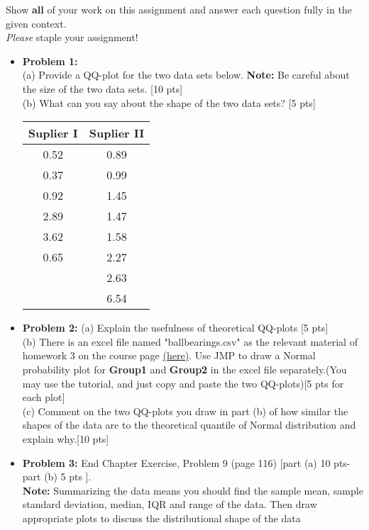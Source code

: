 \documentclass[11pt]{article}\usepackage[]{graphicx}\usepackage[]{color}
\begin{document}
\pagestyle{fancy} 

Show \textbf{all} of your work on this assignment and answer each question fully in the given context. \\


\emph{Please} staple your assignment!

\begin{itemize}

\item \textbf{Problem 1:} \\ %
(a) Provide a QQ-plot for the two data sets below. \textbf{Note:} Be careful about the size of the two data sets. [10 pts] \\
(b) What can you say about the shape of the two data sets? [5 pts]
\begin{center}
	\begin{tabular}{|cc|}	
		\hline
		Suplier I & Suplier II\\
		\hline
		0.52 & 0.89 \\
		0.37 & 0.99 \\ 
		0.92 & 1.45     \\
		2.89 & 1.47     \\
	    3.62 & 1.58     \\
	    0.65 & 2.27     \\
		     & 2.63     \\
		     & 6.54     \\   
	\hline                 
	\end{tabular}
\end{center}

\item \textbf{Problem 2:} (a) Explain the usefulness of theoretical QQ-plots  [5 pts]\\
(b) There is an excel file named "ballbearings.csv" as the relevant material of homework 3 on the course page \href{https://ashirazist.github.io/stat305.github.io/homework.html}{(here)}. Use JMP to draw a Normal probability plot for \textbf{Group1} and \textbf{Group2} in the excel file separately.(You may use the tutorial, and just copy and paste the two QQ-plots)[5 pts for each plot] \\
(c) Comment on the two QQ-plots you draw in part (b) of how similar the shapes of the data are to the theoretical quantile of Normal distribution and explain why.[10 pts]


\item \textbf{Problem 3:}   End Chapter Exercise, Problem 9 (page 116)  [part (a) 10 pts- part (b) 5 pts ]. \\
\textbf{Note:} Summarizing the data means you should find the sample mean, sample standard deviation, median, IQR and range of the data. Then draw appropriate plots to discuss the distributional shape of the data\\
 


\end{itemize}
\end{document}
